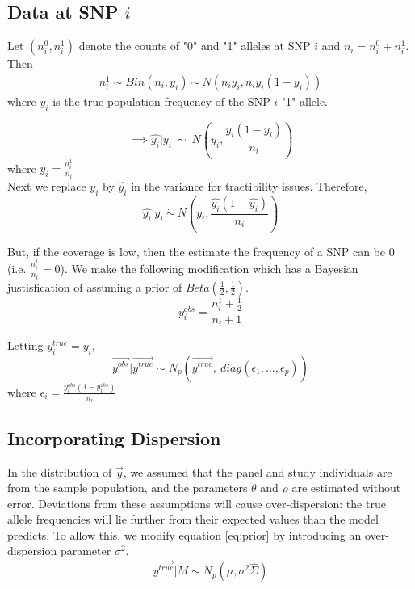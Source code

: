 \documentclass[10pt,a4paper,draft]{article}
\begin{document}
\subsection{Data at SNP $i$}
Let $(n_i^0, n_i^1)$ denote the counts of "0" and "1" alleles at SNP $i$ and $n_i = n_i^0 + n_i^1$. Then 
\begin{align*}
n_i^1 \sim Bin(n_i, y_i) \ \dot{\sim}  \ N(n_iy_i, n_iy_i(1-y_i)) \label{eq:napprox}
\end{align*}
where $y_i$ is the true population frequency of the SNP $i$ "1" allele. 


\begin{equation}
\implies \hat{y_i} | y_i \ \sim \ N(y_i, \frac{y_i(1-y_i)}{n_i})
\end{equation}
where $\hat{y_i} = \frac{n_i^1}{n_i}$\\
Next we replace $y_i$ by $\hat{y_i}$ in the variance for tractibility issues. Therefore,
\begin{equation}
 \hat{y_i} | y_i \ \dot{\sim} \ N(y_i, \frac{\hat{y_i}(1-\hat{y_i})}{n_i}) \label{bin}
\end{equation}

But, if the coverage is low, then the estimate the frequency of a SNP can be 0 (i.e. $\frac{n_i^1}{n_i}=0$). We make the following modification which has a Bayesian justisfication of assuming a prior of $Beta(\frac{1}{2},\frac{1}{2})$.
\begin{equation}
y^{obs}_i = \frac{n_i^1 + \frac{1}{2}}{n_i + 1}
\end{equation}


Letting $y^{true}_i = y_i$,
\begin{equation}
\vec{y^{obs}} | \vec{y^{true}} \sim N_p(\vec{y^{true}}, \ diag(\epsilon_1,...,\epsilon_p))
\end{equation}
where $\epsilon_i = \frac{y^{obs}_i (1-y^{obs}_i)}{n_i}$ 

\subsection{Incorporating Dispersion}
In the distribution of $\vec{y}$, we assumed that the panel and study individuals are from the sample population, and the parameters $\theta$ and $\rho$ are estimated without error. Deviations from these assumptions will cause over-dispersion: the true allele frequencies will lie further from their expected values than the model predicts. To allow this, we modify equation \ref{eq:prior} by introducing an over-dispersion parameter $\sigma^2$.
\begin{equation}
\vec{y^{true}}|M \sim N_p(\hat{\mu}, \sigma^2\hat{\Sigma})
\end{equation}
\end{document}
